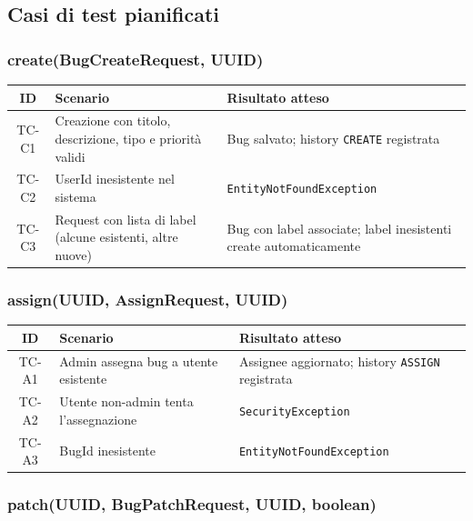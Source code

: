 \subsection{Casi di test pianificati}

\subsubsection{create(BugCreateRequest, UUID)}

\begin{center}
\small
\begin{tabular}{|c|p{6cm}|p{5.5cm}|}
\hline
\textbf{ID} & \textbf{Scenario} & \textbf{Risultato atteso} \\
\hline
TC-C1 & Creazione con titolo, descrizione, tipo e priorità validi & Bug salvato; history \texttt{CREATE} registrata \\
\hline
TC-C2 & UserId inesistente nel sistema & \texttt{EntityNotFoundException} \\
\hline
TC-C3 & Request con lista di label (alcune esistenti, altre nuove) & Bug con label associate; label inesistenti create automaticamente \\
\hline
\end{tabular}
\end{center}

\subsubsection{assign(UUID, AssignRequest, UUID)}

\begin{center}
\small
\begin{tabular}{|c|p{6cm}|p{5.5cm}|}
\hline
\textbf{ID} & \textbf{Scenario} & \textbf{Risultato atteso} \\
\hline
TC-A1 & Admin assegna bug a utente esistente & Assignee aggiornato; history \texttt{ASSIGN} registrata \\
\hline
TC-A2 & Utente non-admin tenta l'assegnazione & \texttt{SecurityException} \\
\hline
TC-A3 & BugId inesistente & \texttt{EntityNotFoundException} \\
\hline
\end{tabular}
\end{center}

\subsubsection{patch(UUID, BugPatchRequest, UUID, boolean)}

